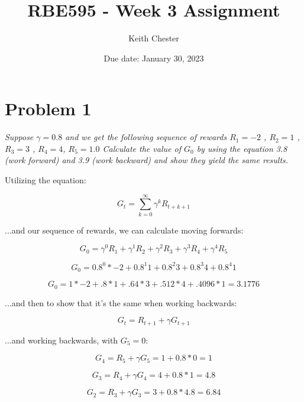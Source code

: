 \documentclass{article}
\title{RBE595 - Week 3 Assignment}
\author{Keith Chester}
\date{Due date: January 30, 2023}
\begin{document}
\maketitle

\section*{Problem 1}
\textit{Suppose $\gamma = 0.8$ and we get the following sequence of rewards $R_1 = -2$ , $R_2 = 1$ , $R_3 = 3$ , $R_4 = 4$, $R_5 = 1.0$
    Calculate the value of $G_0$ by using the equation 3.8 (work forward) and 3.9 (work backward) and show they yield the same results. }

Utilizing the equation:

\begin{equation}
    G_t = \sum_{k=0}^{\infty} \gamma^k R_{t+k+1}
\end{equation}

...and our sequence of rewards, we can calculate moving forwards:

\begin{equation}
    G_0 = \gamma^0 R_1 + \gamma^1 R_2 + \gamma^2 R_3 + \gamma^3 R_4 + \gamma^4 R_5
\end{equation}

\begin{equation}
    G_0 = 0.8^0 * -2 + 0.8^1 1 + 0.8^2 3 + 0.8^3 4 + 0.8^4 1
\end{equation}

\begin{equation}
    G_0 = 1 * -2 + .8 * 1 + .64 * 3 + .512 * 4 + .4096 * 1 = 3.1776
\end{equation}

...and then to show that it's the same when working backwards:

\begin{equation}
    G_t = R_{t+1} + \gamma G_{t+1}
\end{equation}

...and working backwards, with $G_5=0$:

\begin{equation}
    G_4 = R_5 + \gamma G_5 = 1 + 0.8 * 0 = 1
\end{equation}

\begin{equation}
    G_3 = R_4 + \gamma G_4 = 4 + 0.8 * 1 = 4.8
\end{equation}

\begin{equation}
    G_2 = R_3 + \gamma G_3 = 3 + 0.8 * 4.8 = 6.84
\end{equation}
\end{document}

